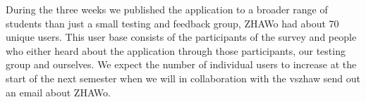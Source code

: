 \begin{markdown}
During the three weeks we published the application to a broader range of students than just a small testing and feedback group, ZHAWo had about 70 unique users. This user base consists of the participants of the survey and people who either heard about the application through those participants, our testing group and ourselves. We expect the number of individual users to increase at the start of the next semester when we will in collaboration with the vszhaw send out an email about ZHAWo.

\newpage

\end{markdown}

